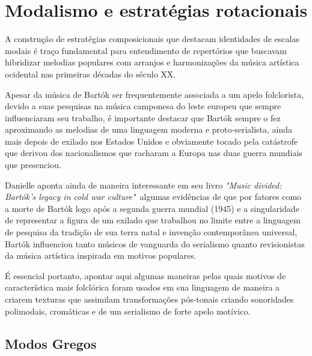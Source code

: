 \documentclass[
	12pt,				%
	openright,			%
	twoside,			%
	a4paper,			%
	english,			%
	french,				%
	spanish,			%
	brazil				%
	]{abntex2}
\begin{document}


\section{Modalismo e estratégias rotacionais}
\label{modalismo}

A construção de estratégias composicionais que destacam identidades de escalas modais é traço fundamental para entendimento de repertórios que buscavam hibridizar melodias populares com arranjos e harmonizações da música artística ocidental nas primeiras décadas do século XX. 

Apesar da música de Bartók ser frequentemente associada a um apelo folclorista, devido a suas pesquisas na música camponesa do leste europeu que sempre influenciaram seu trabalho, é importante destacar que Bartók sempre o fez aproximando as melodias de uma linguagem moderna e proto-serialista, ainda mais depois de exilado nos Estados Unidos e obviamente tocado pela catástrofe que derivou dos nacionalismos que racharam a Europa nas duas guerra mundiais que presenciou.

Danielle  aponta ainda de maneira interessante em seu livro \textit{"Music divided: Bartók's legacy in cold war culture"}\ algumas evidências de que por fatores como a morte de Bartók logo após a segunda guerra mundial (1945) e a singularidade de representar a figura de um exilado que trabalhou no limite entre a linguagem de pesquisa da tradição de sua terra natal e invenção contemporânea universal, Bartók influenciou tanto músicos de vanguarda do serialismo quanto revisionistas da música artística inspirada em motivos populares.

É essencial portanto, apontar aqui algumas maneiras pelas quais motivos de característica mais folclórica foram usados em sua linguagem de maneira a criarem texturas que assimilam transformações pós-tonais criando sonoridades polimodais, cromáticas e de um serialismo de forte apelo motívico.

\subsection{Modos Gregos}
\end{document}
